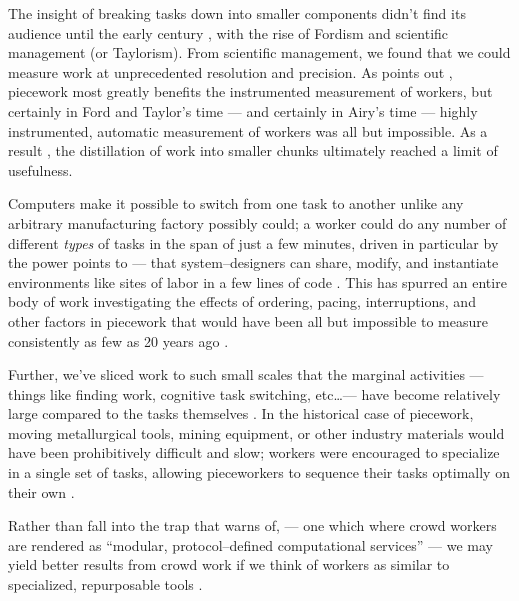 \documentclass[trackingWork]{subfiles}
\begin{document}
The insight of breaking tasks down into smaller components didn't find its audience until
the early  century%
, with the rise of Fordism and scientific management (or Taylorism).
From scientific management, we found that
we could measure work at unprecedented resolution and precision.
As \citeauthor{Brown01041990} points out%
, piecework most greatly benefits the instrumented measurement of workers, but certainly
in Ford and Taylor's time --- and certainly in Airy's time ---
highly instrumented, automatic measurement of workers was all but impossible.
As a result%
, the distillation of work into smaller chunks
ultimately reached a limit of usefulness.


\subsubsubsection{\whatchanged}
 Computers make it possible to switch from one task to another
unlike any arbitrary manufacturing factory possibly could;
a worker could do any number of
different \textit{types} of tasks in the span of just a few minutes,
driven in particular by the power \citeauthor{lessig2006code} points to ---
that system--designers can share, modify, and instantiate environments
like sites of labor in a few lines of code
\cite{delayAndOrderLasecki,lessig2006code}.
This has spurred an entire body of work investigating the effects of
ordering,
pacing,
interruptions, and
other factors in piecework that would have been
all but impossible to measure consistently as few as 20 years ago
\cite{cheng2015break,measuringCrowdsourcingCheng,embracingErrorKrishna}.
 
Further, we've sliced work to such small scales that the marginal activities
--- things like finding work, cognitive task switching, etc\dots ---
have become relatively large compared to the tasks themselves
\cite{taskSearch}.
In the historical case of piecework,
moving metallurgical tools, mining equipment, or
other industry materials would have been prohibitively difficult and slow;
workers were encouraged to specialize in a single set of tasks,
allowing pieceworkers to sequence their tasks optimally on their own
\cite{hart2013rise}.

Rather than fall into the trap that \citeauthor{irani2015cultural} warns of,
--- one which where crowd workers are rendered as
``modular, protocol--defined computational services'' ---
we may yield better results from crowd work if we think of workers as similar to
specialized, repurposable tools
\cite{irani2015cultural}.
 
\end{document}
